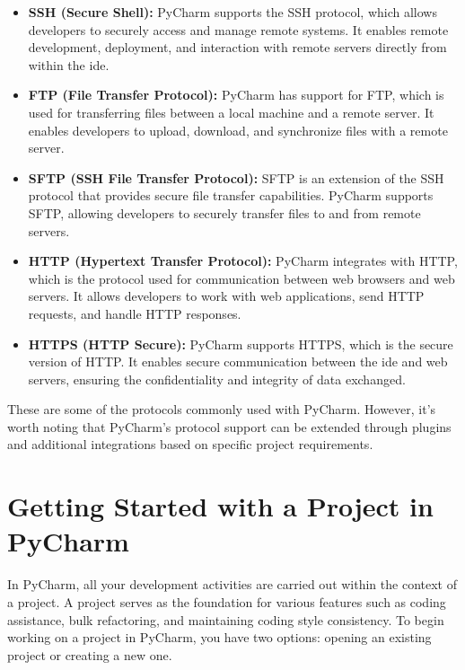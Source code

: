 \begin{itemize}
	\item \textbf{SSH (Secure Shell):} PyCharm supports the SSH protocol, which allows developers to securely access and manage remote systems. It enables remote development, deployment, and interaction with remote servers directly from within the \ac{ide}.
	
	\item \textbf{FTP (File Transfer Protocol):} PyCharm has support for FTP, which is used for transferring files between a local machine and a remote server. It enables developers to upload, download, and synchronize files with a remote server.
	
	\item \textbf{SFTP (SSH File Transfer Protocol):} SFTP is an extension of the SSH protocol that provides secure file transfer capabilities. PyCharm supports SFTP, allowing developers to securely transfer files to and from remote servers.
	
	\item \textbf{HTTP (Hypertext Transfer Protocol):} PyCharm integrates with HTTP, which is the protocol used for communication between web browsers and web servers. It allows developers to work with web applications, send HTTP requests, and handle HTTP responses.
	
	\item \textbf{HTTPS (HTTP Secure):} PyCharm supports HTTPS, which is the secure version of HTTP. It enables secure communication between the \ac{ide} and web servers, ensuring the confidentiality and integrity of data exchanged.
\end{itemize}

These are some of the protocols commonly used with PyCharm. However, it's worth noting that PyCharm's protocol support can be extended through plugins and additional integrations based on specific project requirements.


\section{Getting Started with a Project in PyCharm}

In PyCharm, all your development activities are carried out within the context of a project. A project serves as the foundation for various features such as coding assistance, bulk refactoring, and maintaining coding style consistency. To begin working on a project in PyCharm, you have two options: opening an existing project or creating a new one.

